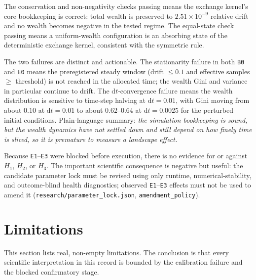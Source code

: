 \documentclass[11pt,a4paper]{article}
\newcommand{\code}[1]{\texttt{#1}}
\begin{document}
The conservation and non-negativity checks passing means the exchange kernel's
core bookkeeping is correct: total wealth is preserved to
$2.51\times10^{-9}$ relative drift and no wealth becomes negative in the tested
regime. The equal-state check passing means a uniform-wealth configuration is
an absorbing state of the deterministic exchange kernel, consistent with the
symmetric rule.

The two failures are distinct and actionable. The stationarity failure in both
\code{B0} and \code{E0} means the preregistered steady window (drift $\le0.1$
and effective samples $\ge$ threshold) is not reached in the allocated time; the
wealth Gini and variance in particular continue to drift. The
$\mathrm{d}t$-convergence failure means the wealth distribution is sensitive to
time-step halving at $\mathrm{d}t=0.01$, with Gini moving from about $0.10$ at
$\mathrm{d}t=0.01$ to about $0.62$--$0.64$ at $\mathrm{d}t=0.0025$ for the
perturbed initial conditions. Plain-language summary: \emph{the simulation
bookkeeping is sound, but the wealth dynamics have not settled down and still
depend on how finely time is sliced, so it is premature to measure a landscape
effect.}

Because \code{E1}--\code{E3} were blocked before execution, there is no
evidence for or against $H_1$, $H_2$, or $H_3$. The important scientific
consequence is negative but useful: the candidate parameter lock must be
revised using only runtime, numerical-stability, and outcome-blind health
diagnostics; observed \code{E1}--\code{E3} effects must not be used to amend it
(\code{research/parameter\_lock.json}, \code{amendment\_policy}).

\section{Limitations}
\label{sec:limits}

This section lists real, non-empty limitations. The conclusion is that every
scientific interpretation in this record is bounded by the calibration failure
and the blocked confirmatory stage.
\end{document}

